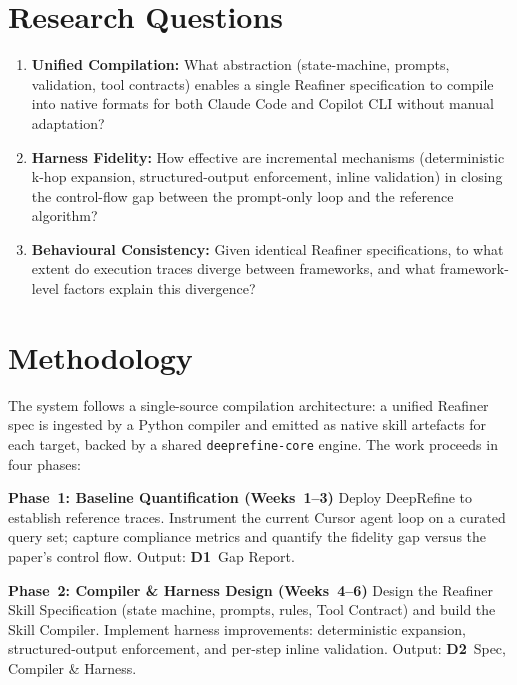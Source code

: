 \documentclass[10pt,a4paper]{article}
\begin{document}
\section{Research Questions}
\begin{enumerate}[label=\textbf{RQ\arabic*},leftmargin=*]
    \item \textbf{Unified Compilation:} What abstraction (state-machine, prompts, validation, tool contracts) enables a single Reafiner specification to compile into native formats for both Claude Code and Copilot CLI without manual adaptation?
    \item \textbf{Harness Fidelity:} How effective are incremental mechanisms (deterministic k-hop expansion, structured-output enforcement, inline validation) in closing the control-flow gap between the prompt-only loop and the reference algorithm?
    \item \textbf{Behavioural Consistency:} Given identical Reafiner specifications, to what extent do execution traces diverge between frameworks, and what framework-level factors explain this divergence?
\end{enumerate}

\section{Methodology}
The system follows a single-source compilation architecture: a unified Reafiner spec is ingested by a Python compiler and emitted as native skill artefacts for each target, backed by a shared \texttt{deeprefine-core} engine. The work proceeds in four phases:

\textbf{Phase~1: Baseline Quantification (Weeks~1--3)} Deploy DeepRefine to establish reference traces. Instrument the current Cursor agent loop on a curated query set; capture compliance metrics and quantify the fidelity gap versus the paper's control flow. Output: \textbf{D1}~Gap Report.

\textbf{Phase~2: Compiler \& Harness Design (Weeks~4--6)} Design the Reafiner Skill Specification (state machine, prompts, rules, Tool Contract) and build the Skill Compiler. Implement harness improvements: deterministic expansion, structured-output enforcement, and per-step inline validation. Output: \textbf{D2}~Spec, Compiler \& Harness.
\end{document}
